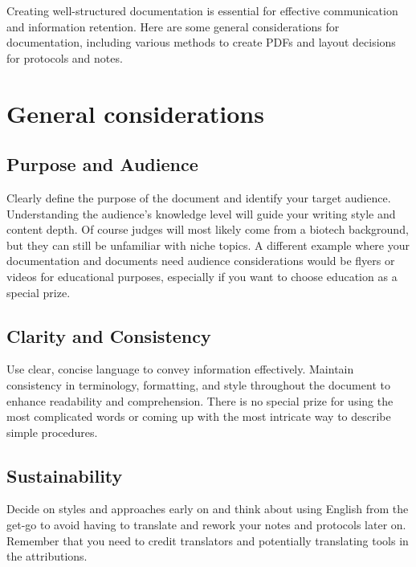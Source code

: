 
Creating well-structured documentation is essential for effective communication and information retention.
Here are some general considerations for documentation, including various methods to create PDFs and layout decisions for protocols and notes.
\section{General considerations} \label{sec:general-considerations}
\subsection*{Purpose and Audience}
Clearly define the purpose of the document and identify your target audience.
Understanding the audience's knowledge level will guide your writing style and content depth.
Of course judges will most likely come from a biotech background, but they can still be unfamiliar with niche topics.
A different example where your documentation and documents need audience considerations would be flyers or videos for educational purposes, especially if you want to choose education as a special prize.

\subsection*{Clarity and Consistency}
Use clear, concise language to convey information effectively.
Maintain consistency in terminology, formatting, and style throughout the document to enhance readability and comprehension.
There is no special prize for using the most complicated words or coming up with the most intricate way to describe simple procedures.

\subsection*{Sustainability}
Decide on styles and approaches early on and think about using English from the get-go to avoid having to translate and rework your notes and protocols later on.
Remember that you need to credit translators and potentially translating tools in the attributions. 


